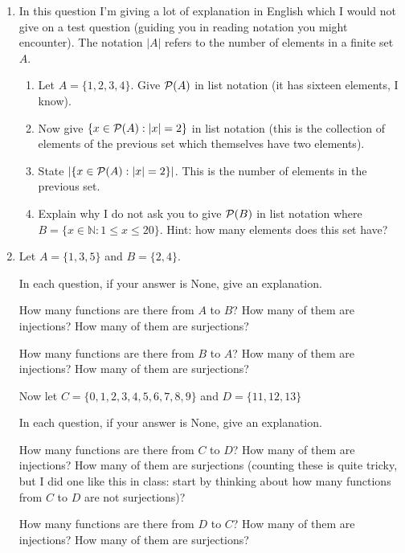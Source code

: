 \documentclass[12pt]{article}
\begin{document}
\begin{enumerate}
\item   In this question I'm giving a lot of explanation in English which I would not give on a test question (guiding you in reading notation you might encounter).  The notation $|A|$ refers to the number of elements in a finite set $A$.
\begin{enumerate}
\item Let $A=\{1,2,3,4\}$.  Give ${\cal P}(A)$ in list notation (it has sixteen elements, I know).

\item Now give $\{x \in {\cal P}(A):|x|=2\}$ in list notation (this is the collection of elements of the previous set which themselves have two elements).

\item State  $|\{x \in {\cal P}(A):|x|=2\}|$.  This is the number of elements in the previous set.

\item Explain why I do not ask you to give ${\cal P}(B)$ in list notation where $B = \{x \in {\mathbb N}:1 \leq x \leq 20\}$.  Hint:  how many elements does this set have?
\end{enumerate}
\item  Let $A = \{1,3,5\}$ and $B = \{2,4\}$.

In each question, if your answer is None, give an explanation.

How many functions are there from $A$ to $B$?  How many of them are injections?  How many of them are surjections?

How many functions are there from $B$ to $A$?  How many of them are injections?  How many of them are surjections?

Now let $C = \{0,1,2,3,4,5,6,7,8,9\}$ and $D = \{11,12,13\}$

In each question, if your answer is None, give an explanation.

How many functions are there from $C$ to $D$?  How many of them are injections?  How many of them are surjections (counting these is quite tricky, but I did one like this in class:  start by thinking about how many functions from $C$ to $D$ are not surjections)?

How many functions are there from $D$ to $C$?  How many of them are injections?  How many of them are surjections?








\end{enumerate}
\end{document}
